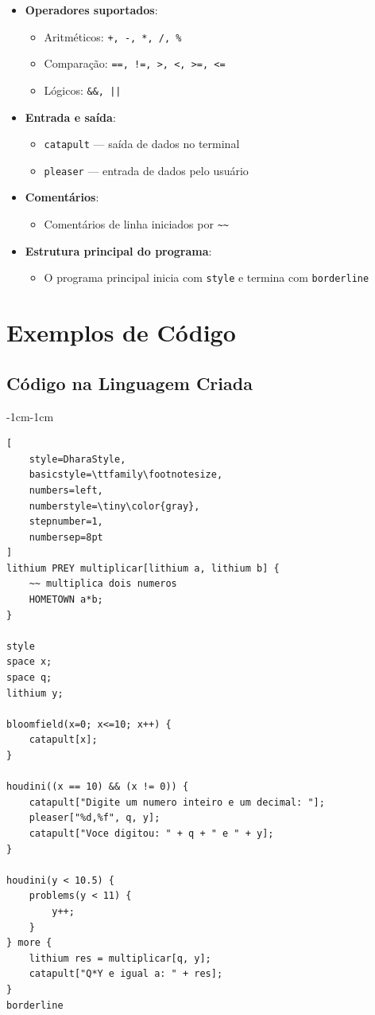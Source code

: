 \documentclass[a4paper,12pt]{article}
\begin{document}
\begin{itemize}
    \item \textbf{Operadores suportados}:
    \begin{itemize}
        \item Aritméticos: \texttt{+, -, *, /, \%}
        \item Comparação: \texttt{==, !=, >, <, >=, <=}
        \item Lógicos: \texttt{\&\&, ||}
    \end{itemize}

    \item \textbf{Entrada e saída}:
    \begin{itemize}
        \item \texttt{catapult} --- saída de dados no terminal
        \item \texttt{pleaser} --- entrada de dados pelo usuário
    \end{itemize}

    \item \textbf{Comentários}:
    \begin{itemize}
        \item Comentários de linha iniciados por \texttt{\~{}\~{}}
    \end{itemize}

    \item \textbf{Estrutura principal do programa}:
    \begin{itemize}
        \item O programa principal inicia com \texttt{style} e termina com \texttt{borderline}
    \end{itemize}
\end{itemize}

\newpage
\section{Exemplos de Código}

\subsection{Código na Linguagem Criada}
\begin{adjustwidth}{-1cm}{-1cm}
\begin{lstlisting}[
    style=DharaStyle,
    basicstyle=\ttfamily\footnotesize,
    numbers=left,
    numberstyle=\tiny\color{gray},
    stepnumber=1,
    numbersep=8pt
]
lithium PREY multiplicar[lithium a, lithium b] {
    ~~ multiplica dois numeros
    HOMETOWN a*b;
}

style
space x;
space q;
lithium y;

bloomfield(x=0; x<=10; x++) {
    catapult[x];
}

houdini((x == 10) && (x != 0)) {
    catapult["Digite um numero inteiro e um decimal: "];
    pleaser["%d,%f", q, y];
    catapult["Voce digitou: " + q + " e " + y];
}

houdini(y < 10.5) {
    problems(y < 11) {
        y++;
    }
} more {
    lithium res = multiplicar[q, y];
    catapult["Q*Y e igual a: " + res];
}
borderline
\end{lstlisting}
\end{adjustwidth}
\end{document}
